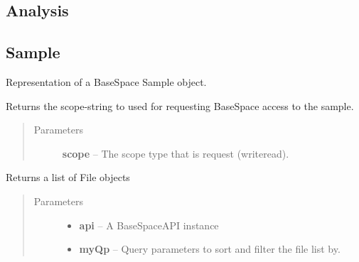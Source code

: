 \documentclass[letterpaper,10pt,english]{sphinxmanual}
\begin{document}
\subsection{Analysis}
\label{Available modules:analysis}

\subsection{Sample}
\label{Available modules:sample}

\begin{fulllineitems}
\label{Available modules:BaseSpacePy.model.Sample.Sample}
Representation of a BaseSpace Sample object.

\begin{fulllineitems}
\label{Available modules:BaseSpacePy.model.Sample.Sample.getAccessStr}
Returns the scope-string to used for requesting BaseSpace access to the sample.
\begin{quote}\begin{description}
\item[{Parameters}] \leavevmode
\textbf{scope} -- The scope type that is request (write\textbar{}read).

\end{description}\end{quote}

\end{fulllineitems}


\begin{fulllineitems}
\label{Available modules:BaseSpacePy.model.Sample.Sample.getFiles}
Returns a list of File objects
\begin{quote}\begin{description}
\item[{Parameters}] \leavevmode\begin{itemize}
\item {} 
\textbf{api} -- A BaseSpaceAPI instance

\item {} 
\textbf{myQp} -- Query parameters to sort and filter the file list by.


\end{itemize}
\end{description}
\end{quote}
\end{fulllineitems}
\end{fulllineitems}
\end{document}
